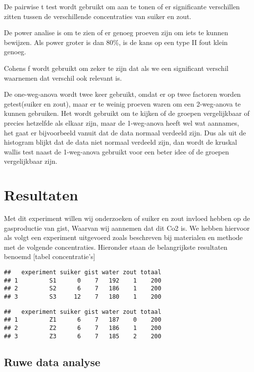 \documentclass[
]{article}
\begin{document}
De pairwise t test wordt gebruikt om aan te tonen of er significante verschillen zitten tussen de verschillende concentraties van suiker en zout.

De power analise is om te zien of er genoeg proeven zijn om iets te kunnen bewijzen. Als power groter is dan 80\%, is de kans op een type II fout klein genoeg.

Cohens f wordt gebruikt om zeker te zijn dat als we een significant verschil waarnemen dat verschil ook relevant is.

De one-weg-anova wordt twee keer gebruikt, omdat er op twee factoren worden getest(suiker en zout), maar er te weinig proeven waren om een 2-weg-anova te kunnen gebruiken. Het wordt gebruikt om te kijken of de groepen vergelijkbaar of precies hetzelfde als elkaar zijn, maar de 1-weg-anova heeft wel wat aannames, het gaat er bijvoorbeeld vanuit dat de data normaal verdeeld zijn.
Dus als uit de histogram blijkt dat de data niet normaal verdeeld zijn, dan wordt de kruskal wallis test naast de 1-weg-anova gebruikt voor een beter idee of de groepen vergelijkbaar zijn.

\section{Resultaten}\label{resultaten}

Met dit experiment willen wij onderzoeken of suiker en zout invloed hebben op de gasproductie van gist, Waarvan wij aannemen dat dit Co2 is. We hebben hiervoor als volgt een experiment uitgevoerd zoals beschreven bij materialen en methode met de volgende concentraties. Hieronder staan de belangrijkste resultaten benoemd
{[}tabel concentratie's{]}

\begin{verbatim}
##   experiment suiker gist water zout totaal
## 1         S1      0    7   192    1    200
## 2         S2      6    7   186    1    200
## 3         S3     12    7   180    1    200
\end{verbatim}

\begin{verbatim}
##   experiment suiker gist water zout totaal
## 1         Z1      6    7   187    0    200
## 2         Z2      6    7   186    1    200
## 3         Z3      6    7   185    2    200
\end{verbatim}

\subsection{Ruwe data analyse}\label{ruwe-data-analyse}
\end{document}
